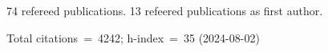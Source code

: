74 refereed publications. 13 refeered publications as first author.

Total citations~=~4242; h-index~=~35 (2024-08-02)